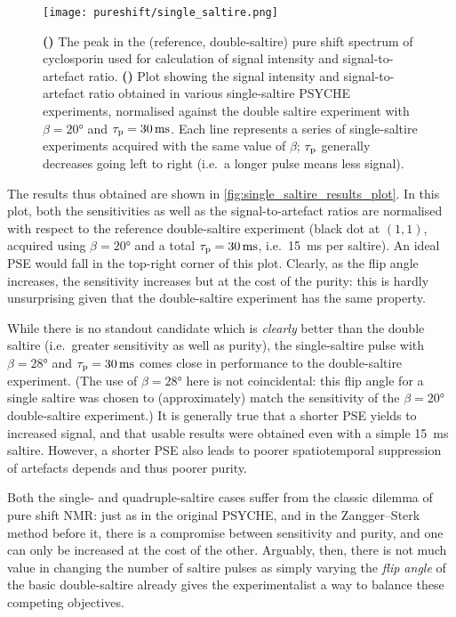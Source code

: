 \begin{figure}[htbp]
    \centering
    \texttt{[image: pureshift/single\_saltire.png]}
    {\label{fig:single_saltire_results_spec}}
    {\label{fig:single_saltire_results_plot}}
    \caption[Single-saltire PSYCHE results]{
        \textbf{()} The peak in the (reference, double-saltire) pure shift spectrum of cyclosporin used for calculation of signal intensity and signal-to-artefact ratio.
        \textbf{()} Plot showing the signal intensity and signal-to-artefact ratio obtained in various single-saltire PSYCHE experiments, normalised against the double saltire experiment with $\beta = \ang{20}$ and $\taup = \SI{30}{\ms}$.
        Each line represents a series of single-saltire experiments acquired with the same value of $\beta$; $\tau_\mathrm{p}$ generally decreases going left to right (i.e.\ a longer pulse means less signal). 
    }
    \label{fig:single_saltire_results}
\end{figure}

The results thus obtained are shown in \cref{fig:single_saltire_results_plot}.
In this plot, both the sensitivities as well as the signal-to-artefact ratios are normalised with respect to the reference double-saltire experiment (black dot at $(1, 1)$, acquired using $\beta = \ang{20}$ and a total $\taup = \SI{30}{\ms}$, i.e.\ \SI{15}{\ms} per saltire).
An ideal PSE would fall in the top-right corner of this plot.
Clearly, as the flip angle increases, the sensitivity increases but at the cost of the purity: this is hardly unsurprising given that the double-saltire experiment has the same property.

While there is no standout candidate which is \textit{clearly} better than the double saltire (i.e.\ greater sensitivity as well as purity), the single-saltire pulse with $\beta = \ang{28}$ and $\taup = \SI{30}{\ms}$ comes close in performance to the double-saltire experiment.
(The use of $\beta = \ang{28}$ here is not coincidental: this flip angle for a single saltire was chosen to (approximately) match the sensitivity of the $\beta = \ang{20}$ double-saltire experiment.)
It is generally true that a shorter PSE yields to increased signal, and that usable results were obtained even with a simple \SI{15}{\ms} saltire.
However, a shorter PSE also leads to poorer spatiotemporal suppression of artefacts depends and thus poorer purity.

Both the single- and quadruple-saltire cases suffer from the classic dilemma of pure shift NMR: just as in the original PSYCHE, and in the Zangger--Sterk method before it, there is a compromise between sensitivity and purity, and one can only be increased at the cost of the other.
Arguably, then, there is not much value in changing the number of saltire pulses as simply varying the \textit{flip angle} of the basic double-saltire already gives the experimentalist a way to balance these competing objectives.
